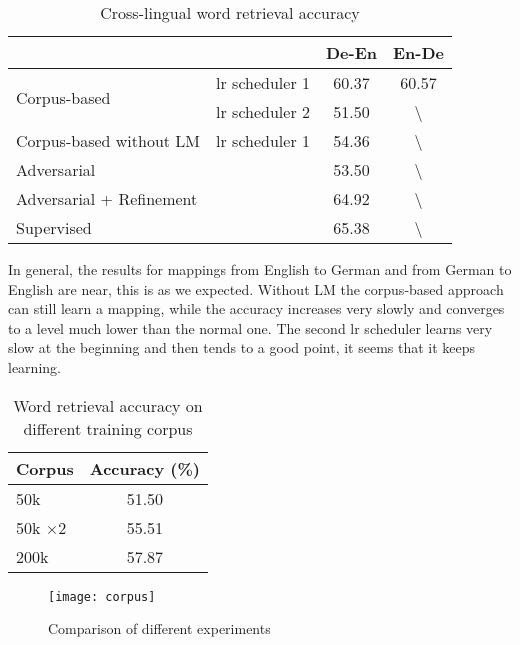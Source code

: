 \begin{table}[H]
	\centering
	\begin{tabular}{llcc}
		\hline
		&                & De-En & En-De            \\ \hline
		\multirow{2}{*}{Corpus-based } & lr scheduler 1 & 60.37 & 60.57            \\ \cline{2-4} 
		& lr scheduler 2 & 51.50 & \textbackslash{} \\ \hline
		Corpus-based without LM              & lr scheduler 1 & 54.36 &        \textbackslash{}           \\ \hline
		Adversarial                            &                & 53.50 &       \textbackslash{}   \\ \hline
		Adversarial + Refinement               &                & 64.92 & \textbackslash{}    \\ \hline
		Supervised                             &                & 65.38 & \textbackslash{}  \\ \hline
	\end{tabular}
	\caption{Cross-lingual word retrieval accuracy}
\end{table}
In general, the results for mappings from English to German and from German to English are near, this is as we expected. Without LM the corpus-based approach can still learn a mapping, while the accuracy increases very slowly and converges to a level much lower than the normal one. The second lr scheduler learns very slow at the beginning and then tends to a good point, it seems that it keeps learning.  

\begin{table}[h]
	\centering
	\begin{tabular}{lc}
		\hline
		Corpus & Accuracy (\%) \\ \hline
		50k    & 51.50         \\ \hline
		50k $\times$2  & 55.51         \\ \hline
		200k   & 57.87         \\ \hline
	\end{tabular}
	\caption{Word retrieval accuracy on different training corpus}
\end{table}
\begin{figure}[h]
	\texttt{[image: corpus]}
	\centering
	\caption{Comparison of different experiments}
\end{figure}


